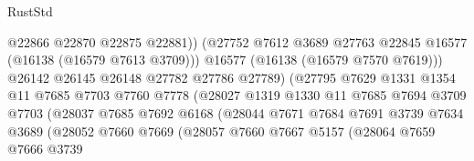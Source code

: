 \begin{lexlean}{RustStd}
\begin{coremodule}
                                        @22866
                                        @22870
                                        @22875
                                        @22881))
                                    (@27752
                                      @7612
                                      @3689
                                      @27763
                                      @22845
                                      @16577
                                      (@16138 (@16579 @7613 @3709)))
                                    @16577
                                    (@16138 (@16579 @7570 @7619)))
                                  @26142
                                  @26145
                                  @26148
                                  @27782
                                  @27786
                                  @27789)
                                (@27795
                                  @7629
                                  @1331
                                  @1354
                                  @11
                                  @7685
                                  @7703
                                  @7760
                                  @7778
                                  (@28027
                                    @1319
                                    @1330
                                    @11
                                    @7685
                                    @7694
                                    @3709
                                    @7703
                                    (@28037
                                      @7685
                                      @7692
                                      @6168
                                      (@28044
                                        @7671
                                        @7684
                                        @7691
                                        @3739
                                        @7634
                                        @3689
                                        (@28052
                                          @7660
                                          @7669
                                          (@28057
                                            @7660
                                            @7667
                                            @5157
                                            (@28064
                                              @7659
                                              @7666
                                              @3739

\end{coremodule}
\end{lexlean}
